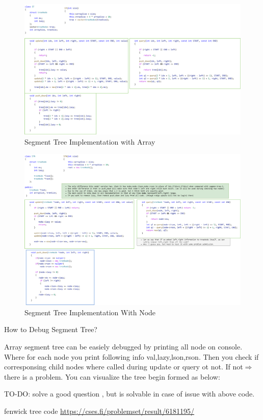 \newpage
\begin{fullwidth}
    \begin{figure}
        \caption{Segment Tree Implementation with Array}
        \includegraphics[width=\dimexpr\textwidth+\marginparwidth]{resources/segment-tree-2(idx).png} 
    \end{figure}


    \begin{figure}
        \caption{Segment Tree Implementation With Node}
        \includegraphics[width=\dimexpr\textwidth+\marginparwidth]{resources/segment-tree-3(node).png}
        
    \end{figure}

    
\end{fullwidth}

{\Large How to Debug Segment Tree?}

Array segment tree can be easiely debugged by printing all node on console. Where for each node you print following info {val,lazy,lson,rson}.
Then you check if corresponsing child nodes where called during update or query ot not.
If not$\Rightarrow$ there is a problem.
You can visualize the tree begin formed as below:


TO-DO: solve a good question , but is solvable in case of issue with above code.

fenwick tree code \href{https://cses.fi/problemset/result/6181195/}{https://cses.fi/problemset/result/6181195/}
